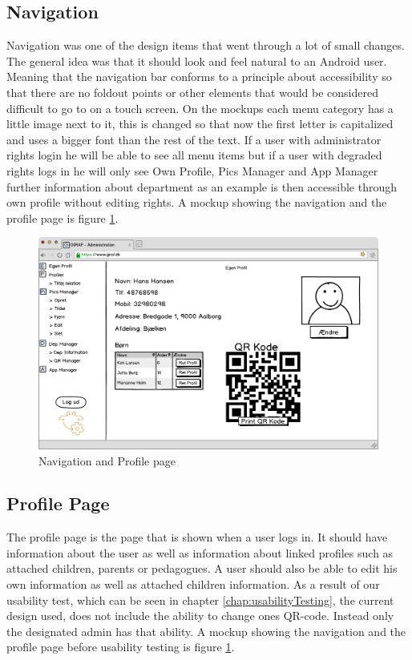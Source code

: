 \subsection{Navigation}
Navigation was one of the design items that went through a lot of small changes. The general idea was that it should look and feel natural to an Android user. Meaning that the navigation bar conforms to a principle about accessibility so that there are no foldout points or other elements that would be considered difficult to go to on a touch screen. On the mockups each menu category has a little image next to it, this is changed so that now the first letter is capitalized and uses a bigger font than the rest of the text. If a user with administrator rights login he will be able to see all menu items but if a user with degraded rights logs in he will only see Own Profile, Pics Manager and App Manager further information about department as an example is then accessible through own profile without editing rights. A mockup showing the navigation and the profile page is figure \ref{fig:own_profileDesign}.
\begin{figure}[p]
\centering
\includegraphics[width=1\textwidth]{images/mockup/egenProfil.png}
\caption{Navigation and Profile page}
\label{fig:own_profileDesign}
\end{figure}

\subsection{Profile Page}
The profile page is the page that is shown when a user logs in. It should have information about the user as well as information about linked profiles such as attached children, parents or pedagogues. A user should also be able to edit his own information as well as attached children information. As a result of our usability test, which can be seen in chapter \ref{chap:usabilityTesting}, the current design used, does not include the ability to change ones QR-code. Instead only the designated admin has that ability. A mockup showing the navigation and the profile page before usability testing is figure \ref{fig:own_profileDesign}.

